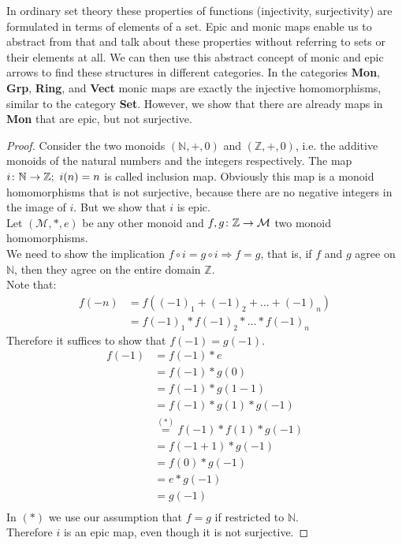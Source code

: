 In ordinary set theory these properties of functions (injectivity, surjectivity) are formulated in terms of elements of a set.
Epic and monic maps enable us to abstract from that and
talk about these properties without referring to sets or their elements at all.
We can then use this abstract concept of monic and epic arrows to find these structures
in different categories.
In the categories \textbf{Mon}, \textbf{Grp}, \textbf{Ring}, and \textbf{Vect}
monic maps are exactly the injective homomorphisms,
similar to the category \textbf{Set}.
However, we show that there are already maps in \textbf{Mon} that are epic, but not surjective.
\begin{proof}
  Consider the two monoids $(\mathbb{N}, +, 0)$ and $(\mathbb{Z}, +, 0)$, i.e. the
  additive monoids of the natural numbers and the integers respectively.
  The map $i \from \mathbb{N} \to \mathbb{Z}; \ i(n) = n$ is called inclusion map.
  Obviously this map is a monoid homomorphisms that is not surjective,
  because there are no negative integers in the image of $i$.
  But we show that $i$ is epic.\\
  Let $(\mathcal{M}, *, e)$ be any other monoid and $f, g \from \mathbb{Z} \to \mathcal{M}$ two
  monoid homomorphisms.\\
  We need to show the implication $f \circ i = g \circ i \Rightarrow f = g$, that is,
  if $f$ and $g$ agree on $\mathbb{N}$, then they agree on the entire domain $\mathbb{Z}$.\\
  Note that:
  \begin{align*}
    f(-n) &= f ((-1)_1 + (-1)_2 + \dots + (-1)_n)\\
          &= f(-1)_1 * f(-1)_2 * \dots * f(-1)_n
  \end{align*}
  Therefore it suffices to show that $f(-1) = g(-1)$.
  \begin{align*}
    f(-1) &= f(-1) * e \\
          &= f(-1) * g(0) \\
          &= f(-1) * g(1 - 1) \\
          &= f(-1) * g(1) * g(-1) \\
          &\overset{(*)}{=} f(-1) * f(1) * g(-1) \\
          &= f(-1 + 1) * g(-1) \\
          &= f(0) * g(-1) \\
          &= e * g(-1) \\
          &= g(-1) \\ 
  \end{align*}
  In $(*)$ we use our assumption that $f=g$ if restricted to $\mathbb{N}$.\\
  Therefore $i$ is an epic map, even though it is not surjective.
\end{proof}

